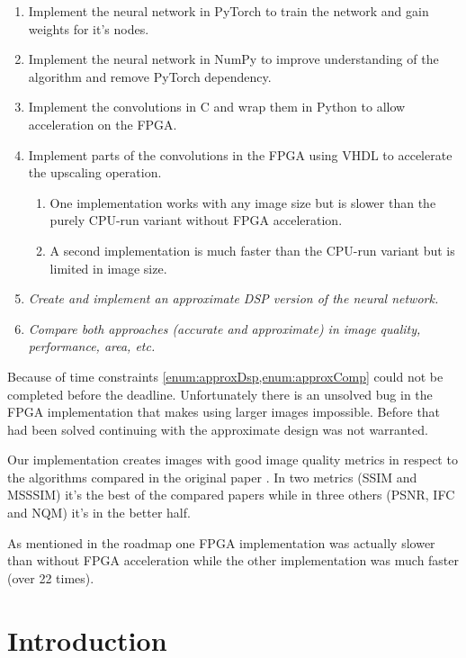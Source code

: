 \documentclass[
			fontsize = 12pt,
			paper = a4
			]
			{scrartcl}%
\newcommand{\?}{\ensuremath{^\texttt{\textbf [CITATION~NEEDED]}}}
\begin{document}
\begin{enumerate}
    \item Implement the neural network in PyTorch to train the network and gain weights for it's nodes.
    \item Implement the neural network in NumPy to improve understanding of the algorithm and remove PyTorch dependency. 
    \item Implement the convolutions in C and wrap them in Python to allow acceleration on the FPGA.
    \item Implement parts of the convolutions in the FPGA using VHDL to accelerate the upscaling operation.
    \begin{enumerate}
        \item One implementation works with any image size but is slower than the purely CPU-run variant without FPGA acceleration.
        \item A second implementation is much faster than the CPU-run variant but is limited in image size.
    \end{enumerate}
    \item \label{enum:approxDsp} \textit{Create and implement an approximate DSP version of the neural network.}
    \item \label{enum:approxComp} \textit{Compare both approaches (accurate and approximate) in image quality, performance, area, etc.}
\end{enumerate}

Because of time constraints \cref{enum:approxDsp,enum:approxComp} could not be completed before the deadline. Unfortunately there is an unsolved bug in the FPGA implementation that makes using larger images impossible. Before that had been solved continuing with the approximate design was not warranted.

Our implementation creates images with good image quality metrics in respect to the algorithms compared in the original paper \cite{dong2015image}. In two metrics (SSIM and MSSSIM) it's the best of the compared papers while in three others (PSNR, IFC and NQM) it's in the better half.

As mentioned in the roadmap one FPGA implementation was actually slower than without FPGA acceleration while the other implementation was much faster (over 22 times).

\newpage

\tableofcontents
\clearpage

\section{Introduction}
\setcounter{page}{1}
\end{document}
